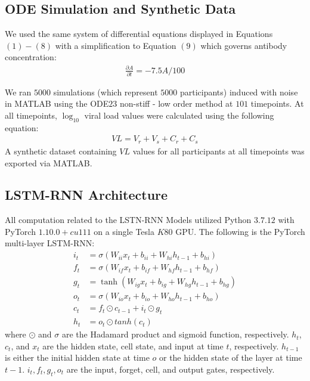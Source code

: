 \documentclass[fleqn,10pt]{wlscirep}
\begin{document}
\subsection*{ODE Simulation and Synthetic Data}
We used the same system of differential equations displayed in Equations $(1)-(8)$ with a simplification to Equation $(9)$ which governs antibody concentration:
\begin{align}
    \frac{\partial A}{\partial t} = -7.5  A/100
\end{align}

\noindent We ran $5000$ simulations (which represent $5000$ participants) induced with noise in MATLAB using the ODE$23$ non-stiff - low order method at $101$ timepoints. At all timepoints, $\log_{10}$ viral load values were calculated using the following equation:
\begin{align}
    VL = V_r + V_s + C_r + C_s
\end{align}
A synthetic dataset containing  $VL$ values for all participants at all timepoints was exported via MATLAB.

\subsection*{LSTM-RNN Architecture}

All computation related to the LSTN-RNN Models utilized Python $3.7.12$ with PyTorch $1.10.0+cu111$ on a single Tesla $K80$ GPU. The following is the PyTorch multi-layer LSTM-RNN:\cite{Sak:2014}
\begin{align}
    i_t & = \sigma(W_{ii}x_t + b_{ii} + W_{hi}h_{t-1} + b_{hi}) \\
    f_t & = \sigma(W_{if}x_t + b_{if} + W_{hf}h_{t-1} + b_{hf}) \\
    g_t & = \tanh(W_{ig}x_t + b_{ig} + W_{hg}h_{t-1} + b_{hg}) \\
    o_t & = \sigma(W_{io}x_t + b_{io} + W_{ho}h_{t-1} + b_{ho}) \\
    c_t & = f_t \odot c_{t-1} + i_t \odot g_t \\
    h_t & = o_t \odot tanh(c_t) 
\end{align}
where $\odot$ and $\sigma$ are the Hadamard product and sigmoid function, respectively. $h_t$, $c_t$, and $x_t$ are the hidden state, cell state, and input at time $t$, respectively. $h_{t-1}$ is either the initial hidden state at time $o$ or the hidden state of the layer at time $t-1$. $i_t,f_t, g_t, o_t$ are the input, forget, cell, and output gates, respectively. 
\end{document}
